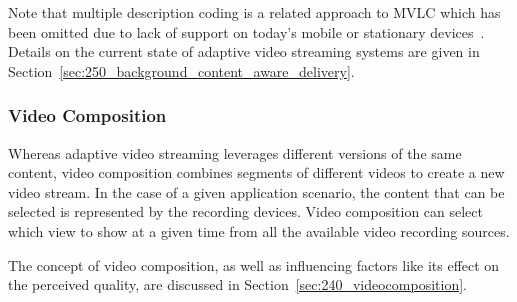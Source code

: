 Note that multiple description coding is a related approach to \ac{MVLC} which has been omitted due to lack of support on today's mobile or stationary devices~\cite{Setton2008}.
Details on the current state of adaptive video streaming systems are given in Section~\ref{sec:250_background_content_aware_delivery}.
\subsubsection{Video Composition}
\label{sec:205_video_composition}
Whereas adaptive video streaming leverages different versions of the same content, video composition combines segments of different videos to create a new video stream.
In the case of a given application scenario, the content that can be selected is represented by the recording devices.
Video composition can select which view to show at a given time from all the available video recording sources.

The concept of video composition, as well as influencing factors like its effect on the perceived quality, are discussed in Section~\ref{sec:240_videocomposition}.
